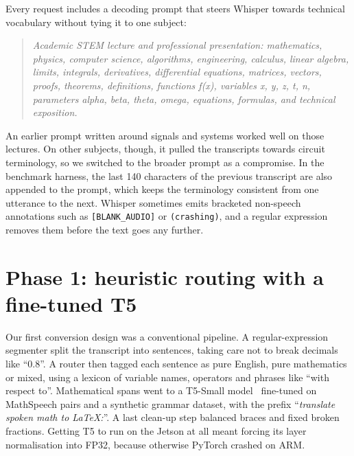 \documentclass[11pt,a4paper,oneside]{report}
\theoremstyle{definition}
\newcommand{\code}[1]{\texttt{\small #1}}
\begin{document}
Every request includes a decoding prompt that steers Whisper towards technical vocabulary without tying it to one subject:
\begin{quote}\small\itshape
Academic STEM lecture and professional presentation: mathematics, physics, computer science, algorithms, engineering, calculus, linear algebra, limits, integrals, derivatives, differential equations, matrices, vectors, proofs, theorems, definitions, functions f(x), variables x, y, z, t, n, parameters alpha, beta, theta, omega, equations, formulas, and technical exposition.
\end{quote}
An earlier prompt written around signals and systems worked well on those lectures. On other subjects, though, it pulled the transcripts towards circuit terminology, so we switched to the broader prompt as a compromise. In the benchmark harness, the last 140 characters of the previous transcript are also appended to the prompt, which keeps the terminology consistent from one utterance to the next. Whisper sometimes emits bracketed non-speech annotations such as \code{[BLANK\_AUDIO]} or \code{(crashing)}, and a regular expression removes them before the text goes any further.

\section{Phase 1: heuristic routing with a fine-tuned T5}
\label{sec:phase1}
Our first conversion design was a conventional pipeline. A regular-expression segmenter split the transcript into sentences, taking care not to break decimals like ``0.8''. A router then tagged each sentence as pure English, pure mathematics or mixed, using a lexicon of variable names, operators and phrases like ``with respect to''. Mathematical spans went to a T5-Small model~\cite{raffel2020t5} fine-tuned on MathSpeech pairs and a synthetic grammar dataset, with the prefix ``\textit{translate spoken math to LaTeX:}''. A last clean-up step balanced braces and fixed broken fractions. Getting T5 to run on the Jetson at all meant forcing its layer normalisation into FP32, because otherwise PyTorch crashed on ARM.
\end{document}
